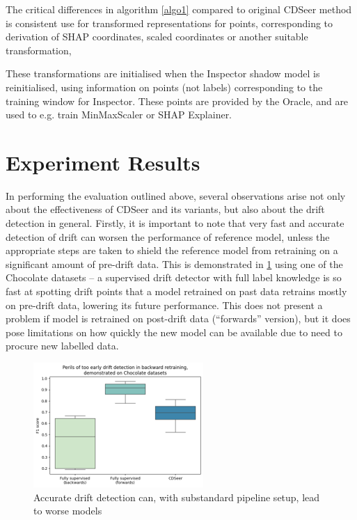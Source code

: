 \documentclass{svproc}
\begin{document}
The critical differences in algorithm \ref{algo1} compared to original CDSeer method is consistent use for transformed representations for points, corresponding to derivation of SHAP coordinates, scaled coordinates or another suitable transformation,

These transformations are initialised when the Inspector shadow model is reinitialised, using information on points (not labels) corresponding to the training window for Inspector. These points are provided by the Oracle, and are used to e.g. train MinMaxScaler or SHAP Explainer.


\section{Experiment Results}

In performing the evaluation outlined above, several observations arise not only about the effectiveness of CDSeer and its variants, but also about the drift detection in general. Firstly, it is important to note that very fast and accurate detection of drift can worsen the performance of reference model, unless the appropriate steps are taken to shield the reference model from retraining on a significant amount of pre-drift data. This is demonstrated in \ref{fig:fig11} using one of the Chocolate datasets – a supervised drift detector with full label knowledge is so fast at spotting drift points that a model retrained on past data retrains mostly on pre-drift data, lowering its future performance. This does not present a problem if model is retrained on post-drift data (“forwards” version), but it does pose limitations on how quickly the new model can be available due to need to procure new labelled data.

\begin{figure}
	\centering
	\includegraphics[scale=.5]{figures/Fig11_res.png}
	\caption{Accurate drift detection can, with substandard pipeline setup, lead to worse models}
	\label{fig:fig11}
\end{figure}
\end{document}
